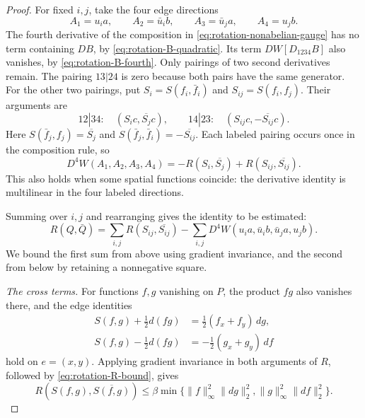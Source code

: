 \begin{proof}
For fixed \(i,j\), take the four edge directions
\begin{equation}
\label{eq:rotation-four-directions}
A_1=u_i a,\qquad A_2=\bar u_i b,\qquad
A_3=\bar u_j a,\qquad A_4=u_j b.
\end{equation}
The fourth derivative of the composition in
\eqref{eq:rotation-nonabelian-gauge} has no term containing \(DB\),
by \eqref{eq:rotation-B-quadratic}. Its term \(DW[D_{1234}B]\)
also vanishes, by \eqref{eq:rotation-B-fourth}. Only pairings of two
second derivatives remain. The pairing \(13|24\) is zero because
both pairs have the same generator. For the other two pairings, put
\(S_i=S(f_i,\bar f_i)\) and \(S_{ij}=S(f_i,f_j)\). Their arguments
are
\[
12|34:\quad(S_i c,\overline{S_j}c),\qquad
14|23:\quad(S_{ij}c,-\overline{S_{ij}}c).
\]
Here \(S(\bar f_j,f_j)=\overline{S_j}\) and
\(S(\bar f_j,\bar f_i)=-\overline{S_{ij}}\). Each labeled pairing
occurs once in the composition rule, so
\begin{equation}
\label{eq:rotation-fourth-identity}
D^4W(A_1,A_2,A_3,A_4)
=-R(S_i,\overline{S_j})+R(S_{ij},\overline{S_{ij}}).
\end{equation}
This also holds when some spatial functions coincide: the derivative
identity is multilinear in the four labeled directions.

Summing over \(i,j\) and rearranging gives the identity to be estimated:
\begin{equation}
\label{eq:rotation-response-balance}
R(Q,\bar Q)
=\sum_{i,j}R(S_{ij},\overline{S_{ij}})
 -\sum_{i,j}D^4W(u_i a,\bar u_i b,\bar u_j a,u_j b).
\end{equation}
We bound the first sum from above using gradient invariance, and the
second from below by retaining a nonnegative square.

\medskip\noindent
\emph{The cross terms.}
For functions \(f,g\) vanishing on \(P\), the product \(fg\)
also vanishes there, and the edge identities
\begin{equation}
\label{eq:rotation-gradient-adjustment}
\begin{split}
S(f,g)+\tfrac12d(fg)&=\tfrac12(f_x+f_y)\,dg,\\
S(f,g)-\tfrac12d(fg)&=-\tfrac12(g_x+g_y)\,df
\end{split}
\end{equation}
hold on \(e=(x,y)\). Applying gradient invariance in both arguments
of \(R\), followed by \eqref{eq:rotation-R-bound}, gives
\begin{equation}
\label{eq:rotation-cross-bound}
R(S(f,g),\overline{S(f,g)})
\le\beta\min\{\|f\|_\infty^2\|dg\|_2^2,
                 \|g\|_\infty^2\|df\|_2^2\}.
\end{equation}


\end{proof}
